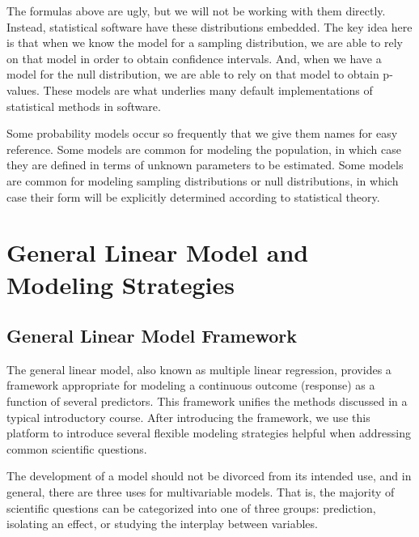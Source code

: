 \documentclass[
]{book}
\theoremstyle{plain}
\theoremstyle{mydefn}
\theoremstyle{myexmpl}
\theoremstyle{remark}
\begin{document}
The formulas above are ugly, but we will not be working with them directly. Instead, statistical software have these distributions embedded. The key idea here is that when we know the model for a sampling distribution, we are able to rely on that model in order to obtain confidence intervals. And, when we have a model for the null distribution, we are able to rely on that model to obtain p-values. These models are what underlies many default implementations of statistical methods in software.

\begin{rmdkeyidea}
Some probability models occur so frequently that we give them names for easy reference. Some models are common for modeling the population, in which case they are defined in terms of unknown parameters to be estimated. Some models are common for modeling sampling distributions or null distributions, in which case their form will be explicitly determined according to statistical theory.
\end{rmdkeyidea}

\hypertarget{part-general-linear-model-and-modeling-strategies}{%
\part{General Linear Model and Modeling Strategies}\label{part-general-linear-model-and-modeling-strategies}}

\hypertarget{glm-framework}{%
\chapter{General Linear Model Framework}\label{glm-framework}}

The general linear model, also known as multiple linear regression, provides a framework appropriate for modeling a continuous outcome (response) as a function of several predictors. This framework unifies the methods discussed in a typical introductory course. After introducing the framework, we use this platform to introduce several flexible modeling strategies helpful when addressing common scientific questions.

The development of a model should not be divorced from its intended use, and in general, there are three uses for multivariable models. That is, the majority of scientific questions can be categorized into one of three groups: prediction, isolating an effect, or studying the interplay between variables.
\end{document}
